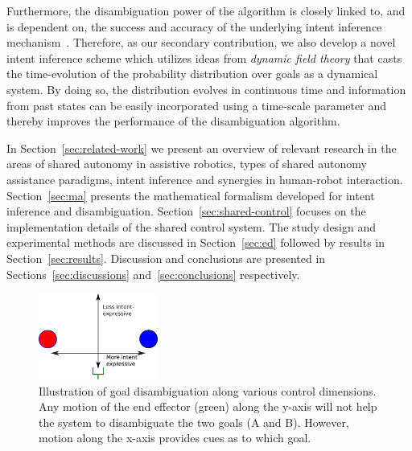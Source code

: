 \documentclass[natbib, twocolumn]{svjour3}          %
\begin{document}
  Furthermore, the disambiguation power of the algorithm is closely linked to, and is dependent on, the success and accuracy of the underlying intent inference mechanism~\citep{gopinath2017mode}. Therefore, as our secondary contribution, we also develop a novel intent inference scheme which utilizes ideas from \textit{dynamic field theory} that casts the time-evolution of the probability distribution over goals as a dynamical system. By doing so, the distribution evolves in continuous time and information from past states can be easily incorporated using a time-scale parameter and thereby improves the performance of the disambiguation algorithm.


In Section~\ref{sec:related-work} we present an overview of relevant research in the areas of shared autonomy in assistive robotics, types of shared autonomy assistance paradigms, intent inference and synergies in human-robot interaction. Section~\ref{sec:ma} presents the mathematical formalism developed for intent inference and disambiguation. Section~\ref{sec:shared-control} focuses on the implementation details of the shared control system. The study design and experimental methods are discussed in Section~\ref{sec:ed} followed by results in Section~\ref{sec:results}. Discussion and conclusions are presented in Sections~\ref{sec:discussions} and~\ref{sec:conclusions} respectively. 
\begin{figure}
	\begin{center}
		\includegraphics[width=0.35\textwidth]{Fig2.eps}
	\end{center}
	\caption{Illustration of goal disambiguation along various control dimensions. Any motion of the end effector (green) along the y-axis will not help the system to disambiguate the two goals (A and B). However, motion along the x-axis provides cues as to which goal.}
	\label{fig:disamb}
\end{figure}
\end{document}
